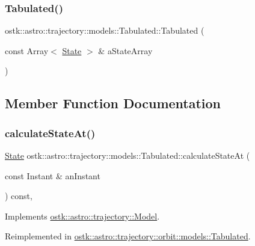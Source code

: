 \subsubsection{\texorpdfstring{Tabulated()}{Tabulated()}}
{\footnotesize\ttfamily ostk\+::astro\+::trajectory\+::models\+::\+Tabulated\+::\+Tabulated (\begin{DoxyParamCaption}\item[{const Array$<$ \hyperlink{classostk_1_1astro_1_1trajectory_1_1_state}{State} $>$ \&}]{a\+State\+Array }\end{DoxyParamCaption})}



\subsection{Member Function Documentation}
\mbox{\label{classostk_1_1astro_1_1trajectory_1_1models_1_1_tabulated_af2ebaa6456986636aa58c2f8666ed0b9}} 
\subsubsection{\texorpdfstring{calculate\+State\+At()}{calculateStateAt()}}
{\footnotesize\ttfamily \hyperlink{classostk_1_1astro_1_1trajectory_1_1_state}{State} ostk\+::astro\+::trajectory\+::models\+::\+Tabulated\+::calculate\+State\+At (\begin{DoxyParamCaption}\item[{const Instant \&}]{an\+Instant }\end{DoxyParamCaption}) const\hspace{0.3cm}{\ttfamily [override]}, {\ttfamily [virtual]}}



Implements \hyperlink{classostk_1_1astro_1_1trajectory_1_1_model_ad25eeaded2946bf73d44161b5f4e9a0e}{ostk\+::astro\+::trajectory\+::\+Model}.



Reimplemented in \hyperlink{classostk_1_1astro_1_1trajectory_1_1orbit_1_1models_1_1_tabulated_ad7935cafe71b572b97b9df93e469d2f8}{ostk\+::astro\+::trajectory\+::orbit\+::models\+::\+Tabulated}.

